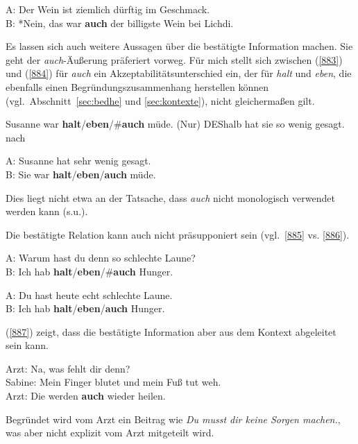 {\begin{exe}
	\ex\label{882}
	A: Der Wein ist ziemlich dürftig im Geschmack.\\
	B: *Nein, das war \textbf{auch} der billigste Wein bei Lichdi.	 
	\hfill\hbox{\citet[211]{Franck1980}}
\end{exe}
Es lassen sich auch weitere Aussagen über die bestätigte Information machen. Sie geht der \textit{auch}-Äußerung präferiert vorweg. Für mich stellt sich zwischen (\ref{883}) und (\ref{884}) für \textit{auch} ein Akzeptabilitätsunterschied ein, der für \textit{halt} und \textit{eben}, die ebenfalls einen Begründungszusammenhang herstellen können (vgl.\ Abschnitt~\ref{sec:bedhe} und \ref{sec:kontexte}), nicht gleichermaßen gilt.

\begin{exe}
	\ex\label{883}
	Susanne war \textbf{halt}/\textbf{eben}/\#\textbf{auch} müde. (Nur) DEShalb hat sie so wenig gesagt.	 
	\hfill\hbox{nach \citet[89]{Autenrieth2002}}
\end{exe}

\begin{exe}
	\ex\label{884}
	A: Susanne hat sehr wenig gesagt.\\
	B: Sie war \textbf{halt}/\textbf{eben}/\textbf{auch} müde.
\end{exe}
Dies liegt nicht etwa an der Tatsache, dass \textit{auch} nicht monologisch verwendet werden kann (s.u.). 

Die bestätigte Relation kann auch nicht präsupponiert  sein (vgl.\ \ref{885} vs. \ref{886}).

\begin{exe}
	\ex\label{885}
	A: Warum hast du denn so schlechte Laune?\\
	B: Ich hab \textbf{halt}/\textbf{eben}/\#\textbf{auch} Hunger.
\end{exe}

\begin{exe}
	\ex\label{886}
	A: Du hast heute echt schlechte Laune.\\
	B: Ich hab \textbf{halt}/\textbf{eben}/\textbf{auch} Hunger.
\end{exe}
(\ref{887}) zeigt, dass die bestätigte Information aber aus dem Kontext abgeleitet sein kann.

\begin{exe}
	\ex\label{887}
	Arzt: Na, was fehlt dir denn?\\
	Sabine: Mein Finger blutet und mein Fuß tut weh.\\
	Arzt: Die werden \textbf{auch} wieder heilen.	 
	\hfill\hbox{\citet[118]{Bublitz1978}}
\end{exe}
Begründet wird vom Arzt ein Beitrag wie \textit{Du musst dir keine Sorgen machen.}, was aber nicht explizit vom Arzt mitgeteilt wird.

}
